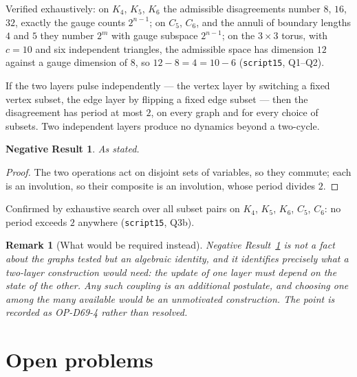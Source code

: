 \documentclass[11pt,a4paper]{article}
\newtheorem{remark}[theorem]{Remark}
\newtheorem{negresult}[theorem]{Negative Result}
\begin{document}
Verified exhaustively: on $K_4$, $K_5$, $K_6$ the admissible disagreements number $8$, $16$, $32$, exactly the gauge counts $2^{n-1}$; on $C_5$, $C_6$, and the annuli of boundary lengths $4$ and $5$ they number $2^m$ with gauge subspace $2^{n-1}$; on the $3\times3$ torus, with $c=10$ and six independent triangles, the admissible space has dimension $12$ against a gauge dimension of $8$, so $12-8=4=10-6$ (\texttt{script15}, Q1--Q2).

\begin{negbox}
If the two layers pulse independently --- the vertex layer by switching a fixed vertex subset, the edge layer by flipping a fixed edge subset --- then the disagreement has period at most $2$, on every graph and for every choice of subsets. Two independent layers produce no dynamics beyond a two-cycle.
\end{negbox}

\begin{negresult}
\label{neg:beat}
As stated.
\end{negresult}

\begin{proof}
The two operations act on disjoint sets of variables, so they commute; each is an involution, so their composite is an involution, whose period divides $2$.
\end{proof}

Confirmed by exhaustive search over all subset pairs on $K_4$, $K_5$, $K_6$, $C_5$, $C_6$: no period exceeds $2$ anywhere (\texttt{script15}, Q3b).

\begin{remark}[What would be required instead]
\label{rem:coupling}
Negative Result~\ref{neg:beat} is not a fact about the graphs tested but an algebraic identity, and it identifies precisely what a two-layer construction would need: the update of one layer must depend on the state of the other. Any such coupling is an additional postulate, and choosing one among the many available would be an unmotivated construction. The point is recorded as OP-D69-4 rather than resolved.
\end{remark}

\section{Open problems}
\label{sec:open}
\end{document}
